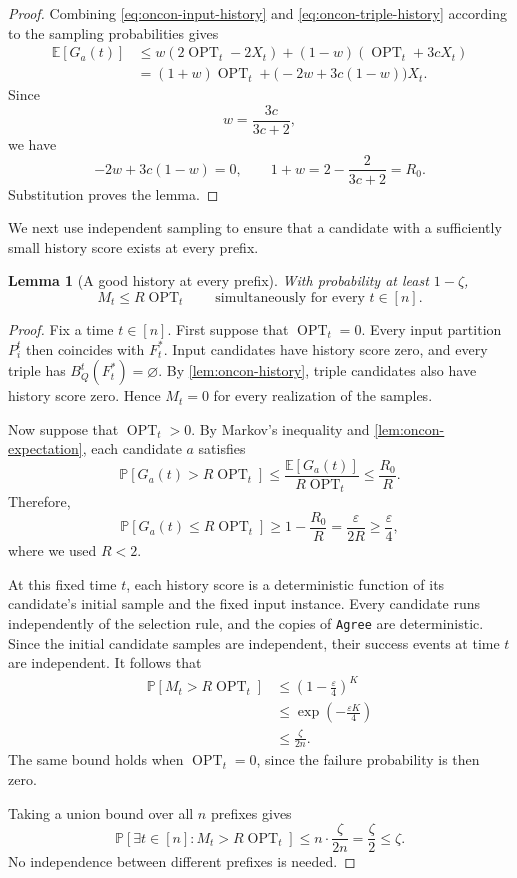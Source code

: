 \documentclass[11pt]{article}
\newtheorem{lemma}[theorem]{Lemma}
\theoremstyle{definition}
\theoremstyle{remark}
\newcommand{\OPT}{\operatorname{OPT}}
\newcommand{\1}{\mathbf{1}}
\newcommand{\E}{\mathbb{E}}
\newcommand{\Prb}{\mathbb{P}}
\begin{document}
\begin{proof}
Combining \eqref{eq:oncon-input-history} and
\eqref{eq:oncon-triple-history} according to the sampling
probabilities gives
\begin{align*}
    \E[G_a(t)]
    &\leq
    w(2\OPT_t-2X_t)
    +(1-w)(\OPT_t+3cX_t)\\
    &=
    (1+w)\OPT_t
    +\bigl(-2w+3c(1-w)\bigr)X_t.
\end{align*}
Since
\[
    w=\frac{3c}{3c+2},
\]
we have
\[
    -2w+3c(1-w)=0,
    \qquad
    1+w
    =
    2-\frac{2}{3c+2}
    =
    R_0.
\]
Substitution proves the lemma.
\end{proof}

We next use independent sampling to ensure that a candidate with
a sufficiently small history score exists at every prefix.

\begin{lemma}[A good history at every prefix]
\label{lem:oncon-good-history}
With probability at least $1-\zeta$,
\[
    M_t\leq R\OPT_t
    \qquad\text{simultaneously for every }t\in[n].
\]
\end{lemma}

\begin{proof}
Fix a time $t\in[n]$. First suppose that $\OPT_t=0$. Every input partition $P_i^t$ then
coincides with $F_t^*$. Input candidates have history score zero,
and every triple has $B_Q^t(F_t^*)=\varnothing$. By
\cref{lem:oncon-history}, triple candidates also have history score
zero. Hence $M_t=0$ for every realization of the samples.

Now suppose that $\OPT_t>0$. By Markov's inequality and
\cref{lem:oncon-expectation}, each candidate $a$ satisfies
\[
    \Prb[G_a(t)>R\OPT_t]
    \leq
    \frac{\E[G_a(t)]}{R\OPT_t}
    \leq
    \frac{R_0}{R}.
\]
Therefore,
\[
    \Prb[G_a(t)\leq R\OPT_t]
    \geq
    1-\frac{R_0}{R}
    =
    \frac{\varepsilon}{2R}
    \geq
    \frac{\varepsilon}{4},
\]
where we used $R<2$.

At this fixed time $t$, each history score is a deterministic
function of its candidate's initial sample and the fixed input
instance. Every candidate runs independently of the selection rule,
and the copies of \texttt{Agree} are deterministic. Since the
initial candidate samples are independent, their success events
at time $t$ are independent. It follows that
\begin{align*}
    \Prb[M_t>R\OPT_t]
    &\leq
    \left(1-\frac{\varepsilon}{4}\right)^K\\
    &\leq
    \exp\left(-\frac{\varepsilon K}{4}\right)\\
    &\leq
    \frac{\zeta}{2n}.
\end{align*}
The same bound holds when $\OPT_t=0$, since the failure probability
is then zero.

Taking a union bound over all $n$ prefixes gives
\[
    \Prb\!\left[
        \exists t\in[n]:M_t>R\OPT_t
    \right]
    \leq
    n\cdot\frac{\zeta}{2n}
    =
    \frac{\zeta}{2}
    \leq
    \zeta.
\]
No independence between different prefixes is needed.
\end{proof}
\end{document}

